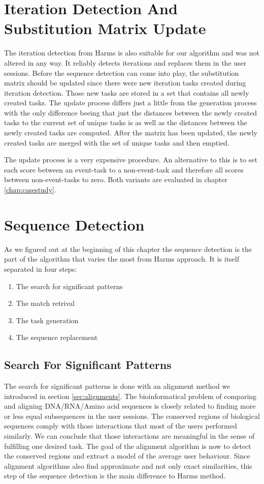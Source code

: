 \section{Iteration Detection And Substitution Matrix Update}
The iteration detection from Harms is also suitable for our algorithm and was not altered in any way. It reliably detects iterations and replaces them in the user sessions.
Before the sequence detection can come into play, the substitution matrix should be updated since there were new iteration tasks created during iteration detection. Those new tasks are stored in a set that contains all newly created tasks.
The update process differs just a little from the generation process with the only difference beeing that just the distances between the newly created tasks to the current set of unique tasks is as well as the distances between the newly created tasks are computed.
After the matrix has been updated, the newly created tasks are merged with the set of unique tasks and then emptied.

The update process is a very expensive procedure. An alternative to this is to set each score between an event-task to a non-event-task and therefore all scores between non-event-tasks to zero.
Both variants are evaluated in chapter \ref{chap:casestudy}.

\section{Sequence Detection}
As we figured out at the beginning of this chapter the sequence detection is the part of the algorithm that varies the most from Harms approach.
It is itself separated in four steps:
\begin{enumerate}
	\item The search for significant patterns
	\item The match retrival
	\item The task generation
	\item The sequence replacement
\end{enumerate}

\subsection{Search For Significant Patterns}
The search for significant patterns is done with an alignment method we introduced in section \ref{sec:alignments}.
The bioinformatical problem of comparing and aligning DNA/RNA/Amino acid sequences is closely related to finding more or less equal subsequences in the user sessions.
The conserved regions of biological sequences comply with those interactions that most of the users performed similarly.
We can conclude that those interactions are meaningful in the sense of fulfilling one desired task.
The goal of the alignment algorithm is now to detect the conserved regions and extract a model of the average user behaviour.
Since alignment algorithms also find approximate and not only exact similarities, this step of the sequence detection is the main difference to Harms method.


